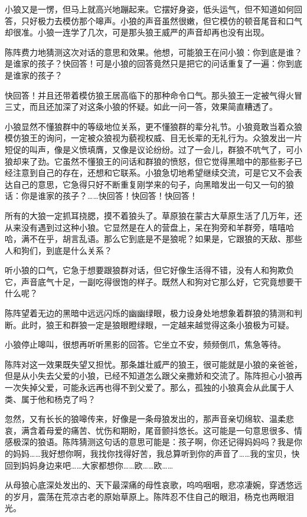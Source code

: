 \par 小狼又是一愣，但马上就高兴地蹦起来。它摆好身姿，低头运气，但不知道如何回答，只好极力去模仿那个嗥声。小狼的声音虽然很嫩，但它模仿的顿音尾音和口气却很准。小狼一连学了几次，可是那头狼王威严的声音却再也没有出现。
\par 陈阵费力地猜测这次对话的意思和效果。他想，可能狼王在问小狼：你到底是谁？是谁家的孩子？快回答！可是小狼的回答竟然只是把它的问话重复了一遍：你到底是谁家的孩子？
\par 快回答！并且还带着模仿狼王居高临下的那种命令口气。那头狼王一定被气得火冒三丈，而且还加深了对这条小狼的怀疑。如此一问一答，效果简直糟透了。
\par 小狼显然不懂狼群中的等级地位关系，更不懂狼群的辈分礼节。小狼竟敢当着众狼模仿狼王的询问，一定被众狼视为藐视权威、目无长辈的无礼行为。众狼发出一片短促的叫声，像是义愤填膺，又像是议论纷纷。过了一会儿，群狼不吭气了，可小狼却来了劲。它虽然不懂狼王的问话和群狼的愤怒，但它觉得黑暗中的那些影子已经注意到自己的存在，还想和它联系。小狼急切地希望继续交流，可是它又不会表达自己的意思，它急得只好不断重复刚学来的句子，向黑暗发出一句又一句的狼话：你是谁家的孩子？……快回答！快回答！快回答！
\par 所有的大狼一定抓耳挠腮，摸不着狼头了。草原狼在蒙古大草原生活了几万年，还从来没有遇到过这种小狼。它显然是在人的营盘上，呆在狗旁和羊群旁，嘻嘻哈哈，满不在乎，胡言乱语。那么它到底是不是狼呢？如果是，它跟狼的天敌、那些人和狗们，到底是什么关系？
\par 听小狼的口气，它急于想要跟狼群对话，但它好像生活得不错，没有人和狗欺负它，声音底气十足，一副吃得很饱的样子。既然人和狗对它那么好，它究竟想要干什么呢？
\par 陈阵望着无边的黑暗中远远闪烁的幽幽绿眼，极力设身处地想象着群狼的猜测和判断。此时，狼王和群狼一定是狼眼瞪绿眼，一定越来越觉得这条小狼极为可疑。
\par 小狼停止嗥叫，很想再听听黑影的回答。它坐立不安，频频倒爪，焦急等待。
\par 陈阵对这一效果既失望又担忧。那条雄壮威严的狼王，很可能就是小狼的亲爸爸，但是从小失去父爱的小狼，已经不知道怎么跟父亲撒娇和交流了。陈阵担心小狼再一次失掉父爱，可能永远再也得不到父爱了。那么，孤独的小狼真会从此属于人类、属于他和杨克了吗？
\par 忽然，又有长长的狼嗥传来，好像是一条母狼发出的，那声音亲切绵软、温柔悲哀，满含着母爱的痛苦、忧伤和期盼，尾音颤抖悠长。这可能是一句意思很多、情感极深的狼语。陈阵猜测这句话的意思可能是：孩子啊，你还记得妈妈吗？我是你的妈妈……我好想你啊，我找你找得好苦，我总算听到你的声音了……我的宝贝，快回到妈妈身边来吧……大家都想你……欧……欧……
\par 从母狼心底深处发出的、天下最深痛的母性哀歌，呜呜咽咽，悲凉凄婉，穿透悠远的岁月，震荡在荒凉古老的原始草原上。陈阵忍不住自己的眼泪，杨克也两眼泪光。
